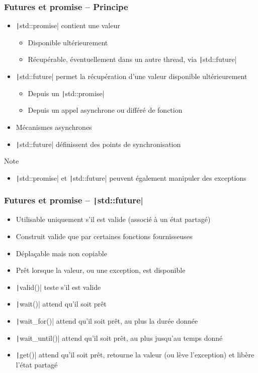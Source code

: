\documentclass[C++.tex]{subfiles}
\begin{document}
\begin{frame}[fragile]
	\frametitle{Futures et promise -- Principe}
	\begin{itemize}
		\item \texttt|std::promise| contient une valeur
		\begin{itemize}
			\item Disponible ultérieurement
			\item Récupérable, éventuellement dans un autre thread, via \texttt|std::future|
		\end{itemize}
		\item \texttt|std::future| permet la récupération d'une valeur disponible ultérieurement
		\begin{itemize}
			\item Depuis un \texttt|std::promise|
			\item Depuis un appel asynchrone ou différé de fonction
		\end{itemize}
		\item Mécanismes asynchrones
		\item \texttt|std::future| définissent des points de synchronisation
	\end{itemize}

	\begin{block}{Note}
		\begin{itemize}
			\item \texttt|std::promise| et \texttt|std::future| peuvent également manipuler des exceptions
		\end{itemize}
	\end{block}
\end{frame}

\begin{frame}[fragile]
	\frametitle{Futures et promise -- \texttt|std::future|}
	\begin{itemize}
		\item Utilisable uniquement s'il est valide (associé à un état partagé)
		\item Construit valide que par certaines fonctions fournisseuses
		\item Déplaçable mais non copiable
		\item Prêt lorsque la valeur, ou une exception, est disponible
		\item \texttt|valid()| teste s'il est valide
		\item \texttt|wait()| attend qu'il soit prêt
		\item \texttt|wait_for()| attend qu'il soit prêt, au plus la durée donnée
		\item \texttt|wait_until()| attend qu'il soit prêt, au plus jusqu'au temps donné
		\item \texttt|get()| attend qu'il soit prêt, retourne la valeur (ou lève l'exception) et libère l'état partagé
	\end{itemize}
\end{frame}
\end{document}
